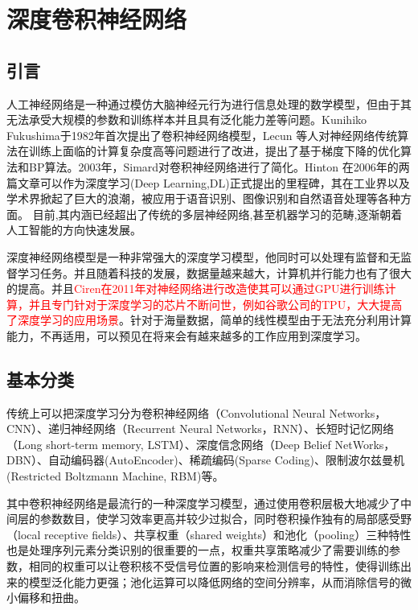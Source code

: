 \chapter{深度卷积神经网络}
\section{引言}
人工神经网络\cite{hebb2005organization}是一种通过模仿大脑神经元行为进行信息处理的数学模型，但由于其无法承受大规模的参数和训练样本并且具有泛化能力差等问题。Kunihiko Fukushima\cite{fukushima1982neocognitron}于1982年首次提出了卷积神经网络模型，Lecun 等人对神经网络传统算法在训练上面临的计算复杂度高等问题进行了改进，提出了基于梯度下降的优化算法\cite{lecun1998gradient}和BP算法\cite{lecun1989backpropagation}。2003年，Simard对卷积神经网络进行了简化\cite{simard2003best}。Hinton 在2006年的两篇文章\cite{hinton2006reducing,hinton2006fast}可以作为深度学习(Deep Learning,DL)正式提出的里程碑，其在工业界以及学术界掀起了巨大的浪潮，被应用于语音识别\cite{hinton2012deep}、图像识别\cite{krizhevsky2012imagenet}和自然语音处理\cite{collobert2011natural}等各种方面。 目前,其内涵已经超出了传统的多层神经网络,甚至机器学习的范畴,逐渐朝着人工智能的方向快速发展\cite{silver2017mastering}。

深度神经网络模型是一种非常强大的深度学习模型，他同时可以处理有监督和无监督学习任务。并且随着科技的发展，数据量越来越大，计算机并行能力也有了很大的提高。并且\textcolor{red}{Ciren在2011年对神经网络进行改造使其可以通过GPU进行训练计算\cite{ciresan2011flexible}，并且专门针对于深度学习的芯片不断问世，例如谷歌公司的TPU\cite{jouppi2017datacenter}，大大提高了深度学习的应用场景}。针对于海量数据，简单的线性模型由于无法充分利用计算能力，不再适用，可以预见在将来会有越来越多的工作应用到深度学习。

\section{基本分类}
传统上可以把深度学习分为卷积神经网络（Convolutional Neural Networks， CNN）、递归神经网络（Recurrent Neural Networks，RNN）、长短时记忆网络（Long short-term memory, LSTM）、深度信念网络（Deep Belief NetWorks，DBN）、自动编码器(AutoEncoder)、稀疏编码(Sparse Coding)、限制波尔兹曼机(Restricted Boltzmann Machine, RBM)等。

其中卷积神经网络是最流行的一种深度学习模型，通过使用卷积层极大地减少了中间层的参数数目，使学习效率更高并较少过拟合，同时卷积操作独有的局部感受野（local receptive fields）、共享权重（shared weights）和池化（pooling）三种特性也是处理序列元素分类识别的很重要的一点，权重共享策略减少了需要训练的参数，相同的权重可以让卷积核不受信号位置的影响来检测信号的特性，使得训练出来的模型泛化能力更强；池化运算可以降低网络的空间分辨率，从而消除信号的微小偏移和扭曲。

